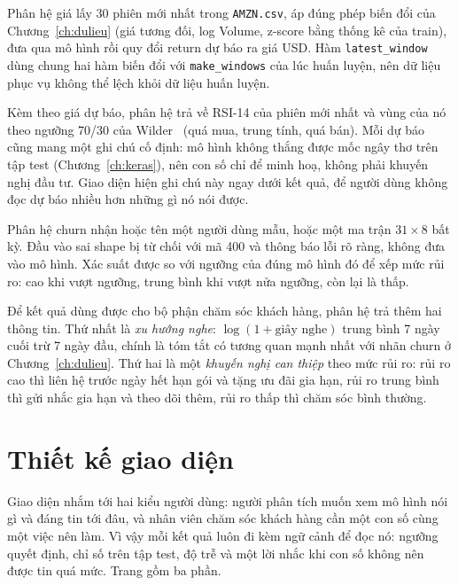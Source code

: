Phân hệ giá lấy 30 phiên mới nhất trong \texttt{AMZN.csv}, áp đúng phép biến đổi của Chương~\ref{ch:dulieu} (giá tương
đối, log Volume, z-score bằng thống kê của train), đưa qua mô hình rồi quy đổi return dự báo ra giá USD. Hàm
\texttt{latest\_window} dùng chung hai hàm biến đổi với \texttt{make\_windows} của lúc huấn luyện, nên dữ liệu phục vụ
không thể lệch khỏi dữ liệu huấn luyện.


Kèm theo giá dự báo, phân hệ trả về RSI-14 của phiên mới nhất và vùng của nó theo ngưỡng 70/30 của
Wilder~\cite{wilder1978} (quá mua, trung tính, quá bán). Mỗi dự báo cũng mang một ghi chú cố định: mô hình không thắng
được mốc ngây thơ trên tập test (Chương~\ref{ch:keras}), nên con số chỉ để minh hoạ, không phải khuyến nghị đầu tư. Giao
diện hiện ghi chú này ngay dưới kết quả, để người dùng không đọc dự báo nhiều hơn những gì nó nói được.

Phân hệ churn nhận hoặc tên một người dùng mẫu, hoặc một ma trận $31 \times 8$ bất kỳ. Đầu vào sai shape bị từ chối với mã
400 và thông báo lỗi rõ ràng, không đưa vào mô hình. Xác suất được so với ngưỡng của đúng mô hình đó để xếp mức rủi ro:
cao khi vượt ngưỡng, trung bình khi vượt nửa ngưỡng, còn lại là thấp.


Để kết quả dùng được cho bộ phận chăm sóc khách hàng, phân hệ trả thêm hai thông tin. Thứ nhất là \emph{xu hướng nghe}:
$\log(1+\text{giây nghe})$ trung bình 7 ngày cuối trừ 7 ngày đầu, chính là tóm tắt có tương quan mạnh nhất với nhãn churn ở
Chương~\ref{ch:dulieu}. Thứ hai là một \emph{khuyến nghị can thiệp} theo mức rủi ro: rủi ro cao thì liên hệ trước ngày hết
hạn gói và tặng ưu đãi gia hạn, rủi ro trung bình thì gửi nhắc gia hạn và theo dõi thêm, rủi ro thấp thì chăm sóc bình
thường.


\section{Thiết kế giao diện}

Giao diện nhắm tới hai kiểu người dùng: người phân tích muốn xem mô hình nói gì và đáng tin tới đâu, và nhân viên chăm
sóc khách hàng cần một con số cùng một việc nên làm. Vì vậy mỗi kết quả luôn đi kèm ngữ cảnh để đọc nó: ngưỡng quyết
định, chỉ số trên tập test, độ trễ và một lời nhắc khi con số không nên được tin quá mức. Trang gồm ba phần.

